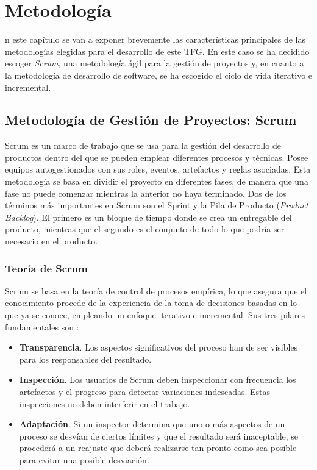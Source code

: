 \chapter{Metodología}
\label{chap:metodologia}

n este capítulo se van a exponer brevemente las características principales de las metodologías elegidas para el desarrollo de este \acs{TFG}. En este caso se ha decidido escoger \textit{Scrum}, una metodología ágil para la gestión de proyectos y, en cuanto a la metodología de desarrollo de software, se ha escogido el ciclo de vida iterativo e incremental.

\section{Metodología de Gestión de Proyectos: Scrum}
Scrum \cite{Schwaber2017} es un marco de trabajo que se usa para la gestión del desarrollo de productos dentro del que se pueden emplear diferentes procesos y técnicas. Posee equipos autogestionados con sus roles, eventos, artefactos y reglas asociadas. Esta metodología se basa en dividir el proyecto en diferentes fases, de manera que una fase no puede comenzar mientras la anterior no haya terminado. Dos de los términos más importantes en Scrum son el Sprint y la Pila de Producto (\textit{Product Backlog}). El primero es un bloque de tiempo donde se crea un entregable del producto, mientras que el segundo es el conjunto de todo lo que podría ser necesario en el producto.

\subsection{Teoría de Scrum}
Scrum se basa en la teoría de control de procesos empírica, lo que asegura que el conocimiento procede de la experiencia de la toma de decisiones basadas en lo que ya se conoce, empleando un enfoque iterativo e incremental. Sus tres pilares fundamentales son \cite{Schwaber2017}:

\begin{itemize}
	\item \textbf{Transparencia}. Los aspectos significativos del proceso han de ser visibles para los responsables del resultado.
	\item \textbf{Inspección}. Los usuarios de Scrum deben inspeccionar con frecuencia los artefactos y el progreso para detectar variaciones indeseadas. Estas inspecciones no deben interferir en el trabajo.
	\item \textbf{Adaptación}. Si un inspector determina que uno o más aspectos de un proceso se desvían de ciertos límites y que el resultado será inaceptable, se procederá a un reajuste que deberá realizarse tan pronto como sea posible para evitar una posible desviación.
\end{itemize}

